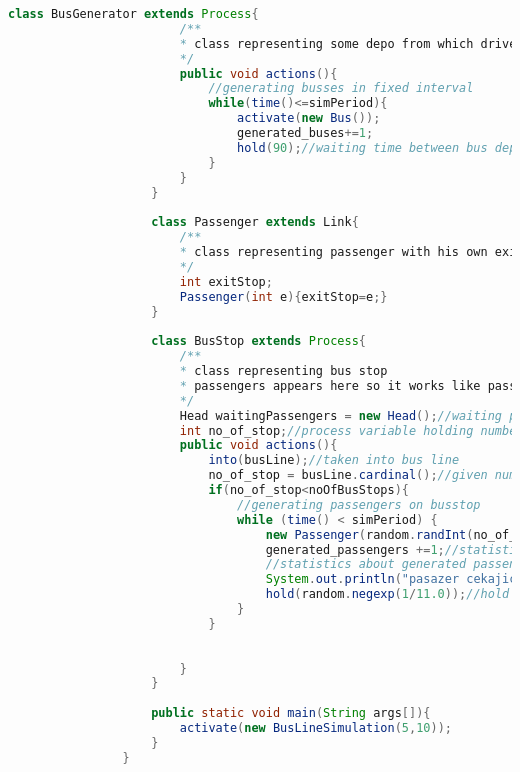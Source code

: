 \documentclass{article}
\begin{document}
\begin{lstlisting}[language=java]
					class BusGenerator extends Process{
						/**
						* class representing some depo from which drive buses in periodic time given by bus line schedule
						*/
						public void actions(){
							//generating busses in fixed interval
							while(time()<=simPeriod){
								activate(new Bus());
								generated_buses+=1;
								hold(90);//waiting time between bus departures
							}
						}
					}
					
					class Passenger extends Link{
						/**
						* class representing passenger with his own exit stop
						*/
						int exitStop;
						Passenger(int e){exitStop=e;}
					}
					
					class BusStop extends Process{
						/**
						* class representing bus stop
						* passengers appears here so it works like passenger generator
						*/
						Head waitingPassengers = new Head();//waiting passengers on bus stop
						int no_of_stop;//process variable holding number of this bus stop
						public void actions(){
							into(busLine);//taken into bus line
							no_of_stop = busLine.cardinal();//given number based on position in bus line
							if(no_of_stop<noOfBusStops){
								//generating passengers on busstop
								while (time() < simPeriod) {
									new Passenger(random.randInt(no_of_stop+1,noOfBusStops)).into(waitingPassengers);//new waiting passenger
									generated_passengers +=1;//statistics of total generated passengers
									//statistics about generated passengers and their desired exit stop
									System.out.println("pasazer cekajici na zastavce: "+no_of_stop+" vystupuje na zastavce: " + ((Passenger)waitingPassengers.first()).exitStop);
									hold(random.negexp(1/11.0));//hold time defining frequency of generating passengers
								}
							}
							
							
						}
					}
					
					public static void main(String args[]){
						activate(new BusLineSimulation(5,10));
					}
				}
				
			\end{lstlisting}
	
\end{document}
